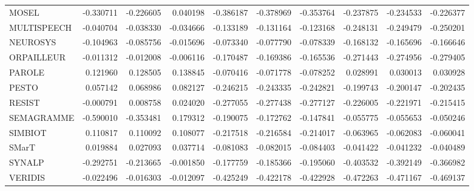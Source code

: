 \begin{tabular}{lrrrrrrrrr}
MOSEL       &           -0.330711 &          -0.226605 &           0.040198 &           -0.386187 &          -0.378969 &          -0.353764 &           -0.237875 &          -0.234533 &          -0.226377 \\
MULTISPEECH &           -0.040704 &          -0.038330 &          -0.034666 &           -0.133189 &          -0.131164 &          -0.123168 &           -0.248131 &          -0.249479 &          -0.250201 \\
NEUROSYS    &           -0.104963 &          -0.085756 &          -0.015696 &           -0.073340 &          -0.077790 &          -0.078339 &           -0.168132 &          -0.165696 &          -0.166646 \\
ORPAILLEUR  &           -0.011312 &          -0.012008 &          -0.006116 &           -0.170487 &          -0.169386 &          -0.165536 &           -0.271443 &          -0.274956 &          -0.279405 \\
PAROLE      &            0.121960 &           0.128505 &           0.138845 &           -0.070416 &          -0.071778 &          -0.078252 &            0.028991 &           0.030013 &           0.030928 \\
PESTO       &            0.057142 &           0.068986 &           0.082127 &           -0.246215 &          -0.243335 &          -0.242821 &           -0.199743 &          -0.200147 &          -0.202435 \\
RESIST      &           -0.000791 &           0.008758 &           0.024020 &           -0.277055 &          -0.277438 &          -0.277127 &           -0.226005 &          -0.221971 &          -0.215415 \\
SEMAGRAMME  &           -0.590010 &          -0.353481 &           0.179312 &           -0.190075 &          -0.172762 &          -0.147841 &           -0.055775 &          -0.055653 &          -0.050246 \\
SIMBIOT     &            0.110817 &           0.110092 &           0.108077 &           -0.217518 &          -0.216584 &          -0.214017 &           -0.063965 &          -0.062083 &          -0.060041 \\
SMarT       &            0.019884 &           0.027093 &           0.037714 &           -0.081083 &          -0.082015 &          -0.084403 &           -0.041422 &          -0.041232 &          -0.040489 \\
SYNALP      &           -0.292751 &          -0.213665 &          -0.001850 &           -0.177759 &          -0.185366 &          -0.195060 &           -0.403532 &          -0.392149 &          -0.366982 \\
VERIDIS     &           -0.022496 &          -0.016303 &          -0.012097 &           -0.425249 &          -0.422178 &          -0.422928 &           -0.472263 &          -0.471167 &          -0.469137 \\
\bottomrule
\end{tabular}
